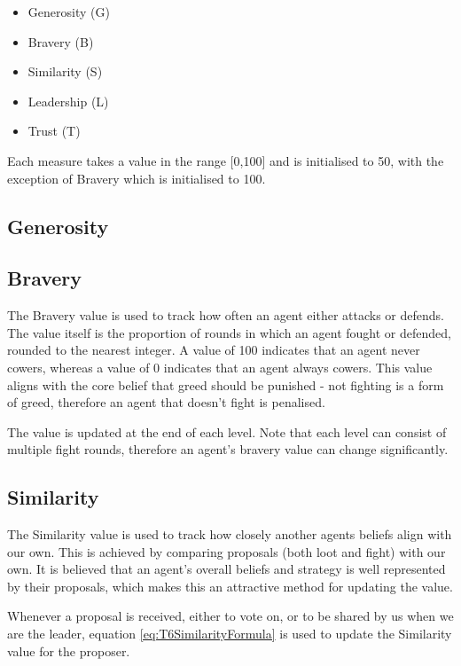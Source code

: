 \begin{itemize}
    \item Generosity (G)
    \item Bravery (B)
    \item Similarity (S)
    \item Leadership (L)
    \item Trust (T)
\end{itemize}

Each measure takes a value in the range [0,100] and is initialised to 50, with the exception of Bravery which is initialised to 100.

\subsection{Generosity}

\subsection{Bravery}

The Bravery value is used to track how often an agent either attacks or defends. The value itself is the proportion of rounds in which an agent fought or defended, rounded to the nearest integer. A value of 100 indicates that an agent never cowers, whereas a value of 0 indicates that an agent always cowers. This value aligns with the core belief that greed should be punished - not fighting is a form of greed, therefore an agent that doesn't fight is penalised.

The value is updated at the end of each level. Note that each level can consist of multiple fight rounds, therefore an agent's bravery value can change significantly.

\subsection{Similarity}

The Similarity value is used to track how closely another agents beliefs align with our own. This is achieved by comparing proposals (both loot and fight) with our own. It is believed that an agent's overall beliefs and strategy is well represented by their proposals, which makes this an attractive method for updating the value.

Whenever a proposal is received, either to vote on, or to be shared by us when we are the leader, equation \ref{eq:T6SimilarityFormula} is used to update the Similarity value for the proposer.

